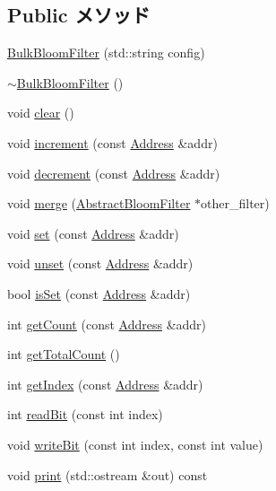 \subsection*{Public メソッド}
\begin{DoxyCompactItemize}
\item 
\hyperlink{classBulkBloomFilter_a61c3f64e7f052ede2aa2c0db43203514}{BulkBloomFilter} (std::string config)
\item 
\hyperlink{classBulkBloomFilter_a69cb69eb468fd0e88f894a717c5ac7e1}{$\sim$BulkBloomFilter} ()
\item 
void \hyperlink{classBulkBloomFilter_ac8bb3912a3ce86b15842e79d0b421204}{clear} ()
\item 
void \hyperlink{classBulkBloomFilter_a3e860ad851b771ac3b6eeb1716eb56bc}{increment} (const \hyperlink{classAddress}{Address} \&addr)
\item 
void \hyperlink{classBulkBloomFilter_addb6b805abb8328082a24926f2bf8c84}{decrement} (const \hyperlink{classAddress}{Address} \&addr)
\item 
void \hyperlink{classBulkBloomFilter_a4091f5f95de040d4e0ae5bd86817b13c}{merge} (\hyperlink{classAbstractBloomFilter}{AbstractBloomFilter} $\ast$other\_\-filter)
\item 
void \hyperlink{classBulkBloomFilter_a2b666fae2a5c2b98bc5cba8e1333bcc9}{set} (const \hyperlink{classAddress}{Address} \&addr)
\item 
void \hyperlink{classBulkBloomFilter_a69b772787ea61467af679e3aa5406b41}{unset} (const \hyperlink{classAddress}{Address} \&addr)
\item 
bool \hyperlink{classBulkBloomFilter_a4200ee289c3d941a4b209c4788f8087c}{isSet} (const \hyperlink{classAddress}{Address} \&addr)
\item 
int \hyperlink{classBulkBloomFilter_abb722634d5846105b673e9496df8d062}{getCount} (const \hyperlink{classAddress}{Address} \&addr)
\item 
int \hyperlink{classBulkBloomFilter_a97f66183ea41a7c123bab9dd5313a74a}{getTotalCount} ()
\item 
int \hyperlink{classBulkBloomFilter_a19f42f6f2fc3501021b768f0df8108b2}{getIndex} (const \hyperlink{classAddress}{Address} \&addr)
\item 
int \hyperlink{classBulkBloomFilter_a6f8a98d0f38a8d122d4cbf87323484eb}{readBit} (const int index)
\item 
void \hyperlink{classBulkBloomFilter_ac188318778d26b44f567c5b530598c16}{writeBit} (const int index, const int value)
\item 
void \hyperlink{classBulkBloomFilter_ac55fe386a101fbae38c716067c9966a0}{print} (std::ostream \&out) const 
\end{DoxyCompactItemize}
